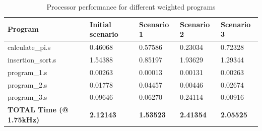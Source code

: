 \documentclass[a4paper,12pt]{article}
\begin{document}
\begin{table}[h!]
\centering
\caption{Processor performance for different weighted programs}
\begin{tabularx}{\textwidth}{|X|X|X|X|X|}
\hline
\textbf{Program} & \textbf{Initial scenario} & \textbf{Scenario 1} & \textbf{Scenario 2} & \textbf{Scenario 3} \\
\hline
calculate\_pi.s   & 0.46068 & 0.57586 & 0.23034 & 0.72328 \\
insertion\_sort.s  & 1.54388 & 0.85197 & 1.93629 & 1.29344 \\
program\_1.s       & 0.00263 & 0.00013 & 0.00131 & 0.00263 \\
program\_2.s       & 0.01778 & 0.04457 & 0.00446 & 0.02674 \\
program\_3.s       & 0.09646 & 0.06270 & 0.24114 & 0.00916 \\
\textbf{TOTAL Time (@ 1.75kHz)} & \textbf{2.12143} & \textbf{1.53523} & \textbf{2.41354} & \textbf{2.05525} \\
\hline
\end{tabularx}
\end{table}
\end{document}
